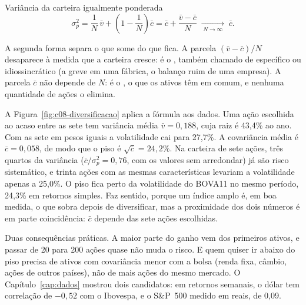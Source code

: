 \begin{resultado}{Variância da carteira igualmente ponderada}
\begin{equation}
  \sigma_p^2 = \frac{1}{N}\,\bar v + \left(1 - \frac{1}{N}\right)\bar c
  = \bar c + \frac{\bar v - \bar c}{N}
  \;\xrightarrow[\;N \to \infty\;]{}\; \bar c .
  \label{eq:c08-limite}
\end{equation}
\end{resultado}

A segunda forma separa o que some do que fica. A parcela $(\bar v - \bar c)/N$ desaparece à medida que a carteira cresce: é o , também chamado de específico ou idiossincrático (a greve em uma fábrica, o balanço ruim de uma empresa). A parcela $\bar c$ não depende de $N$: é o , o que os ativos têm em comum, e nenhuma quantidade de ações o elimina.


A Figura~\ref{fig:c08-diversificacao} aplica a fórmula aos dados. Uma ação escolhida ao acaso entre as sete tem variância média $\bar v = 0,188$, cuja raiz é 43,4\% ao ano. Com as sete em pesos iguais a volatilidade cai para 27,7\%. A covariância média é $\bar c = 0,058$, de modo que o piso é $\sqrt{\bar c} = 24,2\%$. Na carteira de sete ações, três quartos da variância ($\bar c/\sigma_p^2 = 0,76$, com os valores sem arredondar) já são risco sistemático, e trinta ações com as mesmas características levariam a volatilidade apenas a 25,0\%. O piso fica perto da volatilidade do BOVA11 no mesmo período, 24,3\% em retornos simples. Faz sentido, porque um índice amplo é, em boa medida, o que sobra depois de diversificar, mas a proximidade dos dois números é em parte coincidência: $\bar c$ depende das sete ações escolhidas.

Duas consequências práticas. A maior parte do ganho vem dos primeiros ativos, e passar de 20 para 200 ações quase não muda o risco. E quem quiser ir abaixo do piso precisa de ativos com covariância menor com a bolsa (renda fixa, câmbio, ações de outros países), não de mais ações do mesmo mercado. O Capítulo~\ref{cap:dados} mostrou dois candidatos: em retornos semanais, o dólar tem correlação de $-0,52$ com o Ibovespa, e o S\&P~500 medido em reais, de 0,09.


